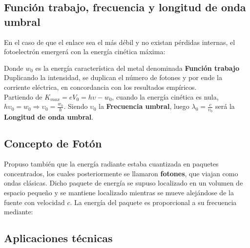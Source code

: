 \documentclass[oneside]{book}
\numberwithin{equation}{section}
\numberwithin{figure}{section}
\numberwithin{table}{section}
\begin{document}
			\subsection{Función trabajo, frecuencia y longitud de onda umbral}
			
				En el caso de que el enlace sea el más débil y no existan pérdidas internas, el fotoelectrón emergerá con la energía cinética máxima:
				
				\begin{center}
				\end{center}
			
				Donde $w_0$ es la energía característica del metal denominada \textbf{Función trabajo}\\
			
				Duplicando la intensidad, se duplican el número de fotones y por ende la corriente eléctrica, en concordancia con los resultados empíricos.\\				
				
				Partiendo de $K_{max}=eV_0=h\upsilon-w_0$, cuando la energía cinética es nula, $h\upsilon_0=w_0 \Rightarrow \upsilon_0=\frac{w_0}{h}$. Siendo $\upsilon_0$ la \textbf{Frecuencia umbral}, luego $\lambda_0=\frac{c}{\upsilon_0}$ será la \textbf{Longitud de onda umbral}.\\			
			
			\subsection{Concepto de Fotón}
			
			Propuso también que la energía radiante estaba cuantizada en paquetes concentrados, los cuales posteriormente se llamaron \textbf{fotones}, que viajan como ondas clásicas.
				Dicho paquete de energía se supuso localizado en un volumen de espacio pequeño y se mantiene localizado mientras se mueve alejándose de la fuente con velocidad $c$. La energía del paquete es proporcional a su frecuencia mediante:
				
				\begin{center}
				\end{center}
			
			\subsection{Aplicaciones técnicas}
						
\end{document}

